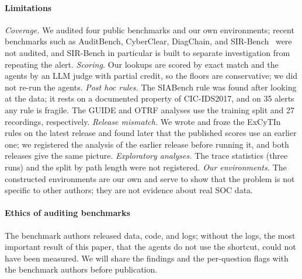 \paragraph{Limitations} \emph{Coverage.} We audited four public benchmarks and our own environments; recent benchmarks such as AuditBench, CyberClear, DiagChain, and SIR-Bench~\citep{auditbench,cyberclear,diagchain,sirbench} were not audited, and SIR-Bench in particular is built to separate investigation from repeating the alert. \emph{Scoring.} Our lookups are scored by exact match and the agents by an LLM judge with partial credit, so the floors are conservative; we did not re-run the agents. \emph{Post hoc rules.} The SIABench rule was found after looking at the data; it rests on a documented property of CIC-IDS2017, and on 35 alerts any rule is fragile. The GUIDE and OTRF analyses use the training split and 27 recordings, respectively. \emph{Release mismatch.} We wrote and froze the ExCyTIn rules on the latest release and found later that the published scores use an earlier one; we registered the analysis of the earlier release before running it, and both releases give the same picture. \emph{Exploratory analyses.} The trace statistics (three runs) and the split by path length were not registered. \emph{Our environments.} The constructed environments are our own and serve to show that the problem is not specific to other authors; they are not evidence about real SOC data.

\paragraph{Ethics of auditing benchmarks} The benchmark authors released data, code, and logs; without the logs, the most important result of this paper, that the agents do not use the shortcut, could not have been measured.  We will share the findings and the per-question flags with the benchmark authors before publication.
